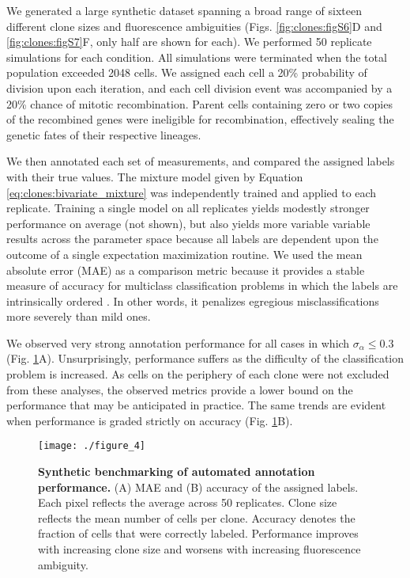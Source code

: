 We generated a large synthetic dataset spanning a broad range of sixteen different clone sizes and fluorescence ambiguities (Figs. \ref{fig:clones:figS6}D and \ref{fig:clones:figS7}F, only half are shown for each). We performed 50 replicate simulations for each condition. All simulations were terminated when the total population exceeded 2048 cells. We assigned each cell a 20\% probability of division upon each iteration, and each cell division event was accompanied by a 20\% chance of mitotic recombination. Parent cells containing zero or two copies of the recombined genes were ineligible for recombination, effectively sealing the genetic fates of their respective lineages. 

We then annotated each set of measurements, and compared the assigned labels with their true values. The mixture model given by Equation \ref{eq:clones:bivariate_mixture} was independently trained and applied to each replicate. Training a single model on all replicates yields modestly stronger performance on average (not shown), but also yields more variable variable results across the parameter space because all labels are dependent upon the outcome of a single expectation maximization routine. We used the mean absolute error (MAE) as a comparison metric because it provides a stable measure of accuracy for multiclass classification problems in which the labels are intrinsically ordered \cite{Gaudette2009}. In other words, it penalizes egregious misclassifications more severely than mild ones.

We observed very strong annotation performance for all cases in which $\sigma_{\alpha} \leq 0.3$ (Fig. \ref{fig:clones:fig4}A). Unsurprisingly, performance suffers as the difficulty of the classification problem is increased. As cells on the periphery of each clone were not excluded from these analyses, the observed metrics provide a lower bound on the performance that may be anticipated in practice. The same trends are evident when performance is graded strictly on accuracy (Fig. \ref{fig:clones:fig4}B).

\begin{figure}[t]
\centering
\texttt{[image: ./figure\_4]}
\captionsetup{width=.65\linewidth}
\caption[Synthetic benchmarking of automated annotation performance.]{\textbf{Synthetic benchmarking of automated annotation performance.} (A) MAE and (B) accuracy of the assigned labels. Each pixel reflects the average across 50 replicates. Clone size reflects the mean number of cells per clone. Accuracy denotes the fraction of cells that were correctly labeled. Performance improves with increasing clone size and worsens with increasing fluorescence ambiguity.}
\label{fig:clones:fig4}
\end{figure}

